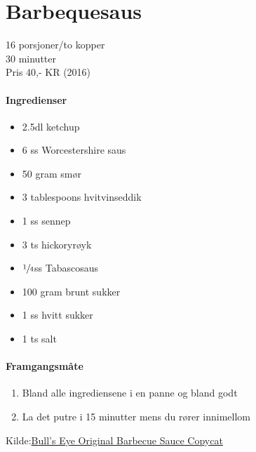 \section{﻿Barbequesaus}
\label{bbq}

16 porsjoner/to kopper\\
30 minutter \\
Pris 40,- KR (2016)\\

\paragraph{Ingredienser}
\begin{itemize}[noitemsep]
		\item 2.5dl ketchup     %
    \item 6 ss Worcestershire saus 	    %
    \item 50 gram smør 	    %
    \item 3 tablespoons hvitvinseddik     %
    \item 1 ss sennep     %
    \item 3 ts hickoryrøyk 	    %
    \item $\sfrac{1}{4}$ss Tabascosaus 	    %
    \item 100 gram brunt sukker 	    %
    \item 1 ss hvitt sukker     %
    \item 1 ts salt 	    %
\end{itemize}

\paragraph{Framgangsmåte}
\begin{enumerate}[noitemsep]
	\item Bland alle ingrediensene i en panne og bland godt
	\item La det putre i 15 minutter mens du rører innimellom
\end{enumerate}

Kilde:\href{http://www.food.com/recipe/bulls-eye-original-barbecue-sauce-copycat-323641}{Bull's Eye Original Barbecue Sauce Copycat}


